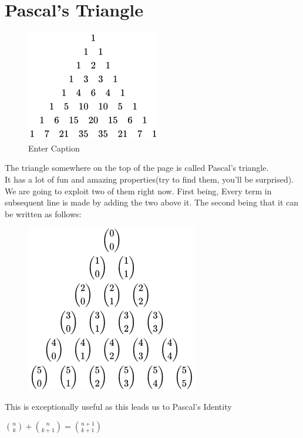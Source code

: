 \section{Pascal's Triangle}
\begin{figure}[H]
    \centering
    \includegraphics[width=0.75\linewidth]{Photos/pascal triangle.png}
    \caption{Enter Caption}
    \label{fig:enter-label}
\end{figure}
The triangle somewhere on the top of the page is called Pascal's triangle. \\
It has a lot of fun and amazing properties(try to find them, you'll be surprised).\\
We are going to exploit two of them right now. First being, Every term in subsequent line is made by adding the two above it. The second being that it can be written as follows:
\begin{figure}[H]
\includegraphics{Photos/Binomial Pascal.png}
\end{figure}
This is exceptionally useful as this leads us to Pascal's Identity
\begin{theorem}
    $\binom{n}{k} + \binom{n}{k+1}=\binom{n+1}{k+1}$
\end{theorem}
